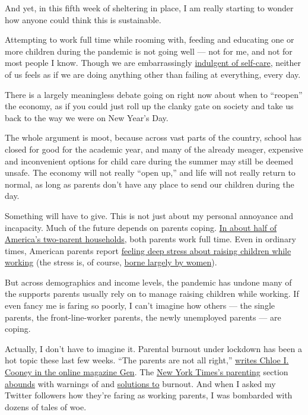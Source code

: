 And yet, in this fifth week of sheltering in place, I am really starting
to wonder how anyone could think this is sustainable.

Attempting to work full time while rooming with, feeding and educating
one or more children during the pandemic is not going well --- not for
me, and not for most people I know. Though we are embarrassingly
\href{https://www.nytimes3xbfgragh.onion/2019/01/09/opinion/meditation-internet.html}{indulgent
of self-care}, neither of us feels as if we are doing anything other
than failing at everything, every day.

There is a largely meaningless debate going on right now about when to
``reopen'' the economy, as if you could just roll up the clanky gate on
society and take us back to the way we were on New Year's Day.

The whole argument is moot, because across vast parts of the country,
school has closed for good for the academic year, and many of the
already meager, expensive and inconvenient options for child care during
the summer may still be deemed unsafe. The economy will not really
``open up,'' and life will not really return to normal, as long as
parents don't have any place to send our children during the day.

Something will have to give. This is not just about my personal
annoyance and incapacity. Much of the future depends on parents coping.
\href{https://www.theatlantic.com/politics/archive/2015/11/how-working-moms-are-changing-american-households/433332/}{In
about half of America's two-parent households}, both parents work full
time. Even in ordinary times, American parents report
\href{https://www.nytimes3xbfgragh.onion/2015/11/05/upshot/stressed-tired-rushed-a-portrait-of-the-modern-family.html}{feeling
deep stress about raising children while working} (the stress is, of
course,
\href{https://english.emmaclit.com/2017/05/20/you-shouldve-asked/}{borne
largely by women}).

But across demographics and income levels, the pandemic has undone many
of the supports parents usually rely on to manage raising children while
working. If even fancy me is faring so poorly, I can't imagine how
others --- the single parents, the front-line-worker parents, the newly
unemployed parents --- are coping.

Actually, I don't have to imagine it. Parental burnout under lockdown
has been a hot topic these last few weeks. ``The parents are not all
right,''
\href{https://gen.medium.com/parents-are-not-ok-66ab2a3e42d9}{writes
Chloe I. Cooney in the online magazine Gen}. The
\href{https://parenting.nytimes3xbfgragh.onion/?type=roundup\&link=intro}{New
York Times's parenting} section
\href{https://www.nytimes3xbfgragh.onion/2020/04/08/parenting/coronavirus-self-care.html}{abounds}
with warnings of and
\href{https://www.nytimes3xbfgragh.onion/2020/03/30/parenting/coronavirus-comfort-food-kids.html}{solutions
to} burnout. And when I asked my Twitter followers how they're faring as
working parents, I was bombarded with dozens of tales of woe.

